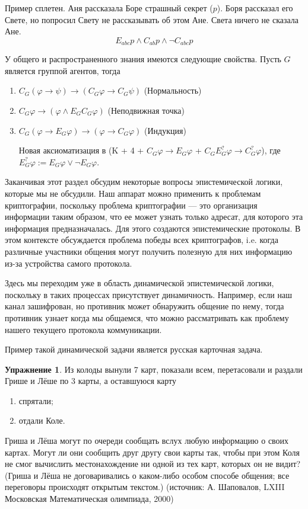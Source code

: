 \documentclass[openany]{book}
\theoremstyle{plain}
\theoremstyle{definition}
\newtheorem{xrc}{Упражнение}[]
\begin{document}
Пример сплетен. Аня рассказала Боре страшный секрет (\(p\)). Боря рассказал его Свете, но попросил Свету не рассказывать об этом Ане. Света ничего не сказала Ане.
\[E_{abc} p \land C_{ab} p \land \neg C_{abc} p\]

У общего и распространенного знания имеются следующие свойства. Пусть \(G\) является группой агентов, тогда
\begin{enumerate}
    \item \(C_G (\varphi \to \psi) \to (C_G \varphi \to C_G \psi)\) (Нормальность)
    \item \(C_G \varphi \to (\varphi \land E_G C_G \varphi)\) (Неподвижная точка)
    \item \(C_G (\varphi \to E_G \varphi) \to (\varphi \to C_G \varphi)\) (Индукция)

	Новая аксиоматизация в \cite{Herzig} (K + 4 + \(C_G \varphi \to E_G \varphi\) + \(C_G E_G^? \varphi \to C_G^? \varphi\)), где \(E_G^? \varphi := E_G \varphi \lor \neg E_G \varphi\).
\end{enumerate}

Заканчивая этот раздел обсудим некоторые вопросы эпистемической логики, которые мы не обсудили. 
Наш аппарат можно применить к проблемам криптографии, поскольку проблема криптографии --- это организация информации таким образом, что ее может узнать только адресат, для которого эта информация предназначалась. Для этого создаются эпистемические протоколы. В этом контексте обсуждается проблема победы всех криптографов, i.e. когда различные участники общения могут получить полезную для них информацию из-за устройства самого протокола.

Здесь мы переходим уже в область динамической эпистемической логики, поскольку в таких процессах присутствует динамичность. Например, если наш канал зашифрован, но противник может обнаружить общение по нему, тогда противник узнает когда мы общаемся, что можно рассматривать как проблему нашего текущего протокола коммуникации.

Пример такой динамической задачи является русская карточная задача.
\begin{xrc}
    Из колоды вынули 7 карт, показали всем, перетасовали и раздали Грише и Лёше по 3 карты, а оставшуюся карту
    \begin{enumerate}
	\item спрятали;
	\item отдали Коле.
    \end{enumerate}
    Гриша и Лёша могут по очереди сообщать вслух любую информацию о своих картах. Могут ли они сообщить друг другу свои карты так, чтобы при этом Коля не смог вычислить местонахождение ни одной из тех карт, которых он не видит? (Гриша и Лёша не договаривались о каком-либо особом способе общения; все переговоры происходят открытым текстом.) (источник: А. Шаповалов, LXIII Московская Математическая олимпиада, 2000)
\end{xrc}
\end{document}
